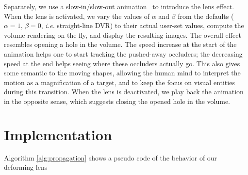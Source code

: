 Separately, we use a slow-in/slow-out animation~\cite{Dragicevic:2011:TDA:1978942.1979233} to introduce the lens effect. When the lens is activated, we vary the values of $\alpha$ and $\beta$ from the defaults ($\alpha=1$, $\beta=0$, \emph{i.e.} straight-line DVR) to their actual user-set values, compute the volume rendering on-the-fly, and display the resulting images. The overall effect resembles opening a hole in the volume. The speed increase at the start of the animation helps one to start tracking the pushed-away occluders; the decreasing speed at the end helps seeing where these occluders actually go. This also gives some semantic to the moving shapes, allowing the human mind to interpret the motion as a magnification of a target, and to keep the focus on visual entities during this transition. When the lens is deactivated, we play back the animation in the opposite sense, which suggests closing the opened hole in the volume.

\section{Implementation}
\label{sec:implem}

Algorithm \ref{alg:propagation} shows a pseudo code of the behavior of our deforming lens


